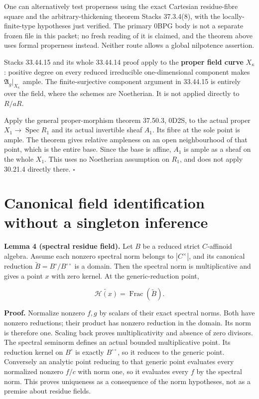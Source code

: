 \documentclass[
  11pt,
]{article}
\begin{document}
One can alternatively test properness using the exact Cartesian
residue-fibre square and the arbitrary-thickening theorem Stacks
37.3.4(8), with the locally-finite-type hypotheses just verified. The
primary 0BPG body is not a separate frozen file in this packet; no fresh
reading of it is claimed, and the theorem above uses formal properness
instead. Neither route allows a global nilpotence assertion.

Stacks 33.44.15 and its whole 33.44.14 proof apply to the \textbf{proper
field curve} \(X_\kappa\): positive degree on every reduced irreducible
one-dimensional component makes \(\mathfrak A_g|_{X_\kappa}\) ample. The
finite-surjective component argument in 33.44.15 is entirely over the
field, where the schemes are Noetherian. It is not applied directly to
\(R/aR\).

Apply the general proper-morphism theorem 37.50.3, 0D2S, to the actual
proper \(X_1\to\operatorname{Spec}R_1\) and its actual invertible sheaf
\(A_1\). Its fibre at the sole point is ample. The theorem gives
relative ampleness on an open neighbourhood of that point, which is the
entire base. Since the base is affine, \(A_1\) is ample as a sheaf on
the whole \(X_1\). This uses no Noetherian assumption on \(R_1\), and
does not apply 30.21.4 directly there. \(\square\)

\section{Canonical field identification without a singleton
inference}\label{canonical-field-identification-without-a-singleton-inference}

\textbf{Lemma 4 (spectral residue field).} Let \(B\) be a reduced strict
\(C\)-affinoid algebra. Assume each nonzero spectral norm belongs to
\(|C^\times|\), and its canonical reduction
\(\widetilde B=B^\circ/B^{\circ\circ}\) is a domain. Then the spectral
norm is multiplicative and gives a point \(x\) with zero kernel. At the
generic-reduction point,

\[
 \widetilde{\mathcal H(x)}=\operatorname{Frac}(\widetilde B).
\]

\textbf{Proof.} Normalize nonzero \(f,g\) by scalars of their exact
spectral norms. Both have nonzero reductions; their product has nonzero
reduction in the domain. Its norm is therefore one. Scaling back proves
multiplicativity and absence of zero divisors. The spectral seminorm
defines an actual bounded multiplicative point. Its reduction kernel on
\(B^\circ\) is exactly \(B^{\circ\circ}\), so it reduces to the generic
point. Conversely an analytic point reducing to that generic point
evaluates every normalized nonzero \(f/c\) with norm one, so it
evaluates every \(f\) by the spectral norm. This proves uniqueness as a
consequence of the norm hypotheses, not as a premise about residue
fields.
\end{document}
